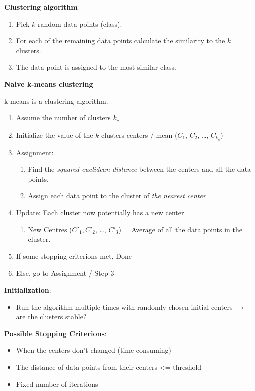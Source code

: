 \documentclass[11pt,twoside,landscape]{article}
\begin{document}
\begin{multicols}{3}
\textbf{Clustering algorithm}

\begin{enumerate}
\item Pick \(k\) random data points (class).
\item For each of the remaining data points calculate the similarity to the \(k\) clusters.
\item The data point is assigned to the most similar class.
\end{enumerate}


\textbf{Naive k-means clustering}

k-means is a clustering algorithm.

\begin{enumerate}
\item Assume the number of clusters \(k_c\)
\item Initialize the value of the \(k\) clusters centers / mean (\(C_1\), \(C_2\), \ldots{}, \(C_{k_c}\))
\item Assignment:
\begin{enumerate}
\item Find the \emph{squared euclidean distance} between the centers and all the data points.
\item Assign each data point to the cluster of \emph{the nearest center}
\end{enumerate}
\item Update: Each cluster now potentially has a new center.
\begin{enumerate}
\item New Centres (\(C'_1, C'_2\), \ldots{}, \(C'_3\)) = Average of all the data points in the cluster.
\end{enumerate}
\item If some stopping criterions met, Done
\item Else, go to Assignment / Step 3
\end{enumerate}


\textbf{Initialization}:

\begin{itemize}
\item Run the algorithm multiple times with randomly chosen initial centers \(\rightarrow\) are the clusters stable?
\end{itemize}


\textbf{Possible Stopping Criterions}:

\begin{itemize}
\item When the centers don't changed (time-consuming)
\item The distance of data points from their centers <= threshold
\item Fixed number of iterations
\end{itemize}



\end{multicols}
\end{document}
